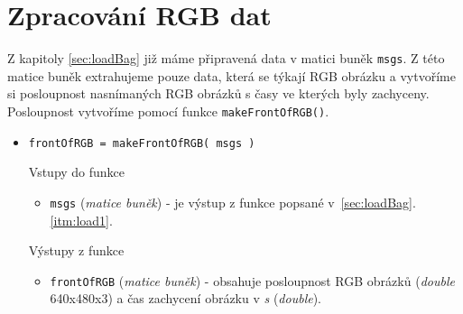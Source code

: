 \documentclass[10pt,a4paper,titlepage,oneside]{report}
\begin{document}
\section{Zpracování RGB dat}
\label{sec:procRgb}
Z kapitoly \ref{sec:loadBag} již máme připravená data v matici buněk \verb|msgs|. Z této matice buněk extrahujeme pouze data, která se týkají RGB obrázku a vytvoříme si posloupnost nasnímaných RGB obrázků s časy ve kterých byly zachyceny. Posloupnost vytvoříme pomocí funkce \verb|makeFrontOfRGB()|.
\begin{itemize}
  	\item \verb|frontOfRGB = makeFrontOfRGB( msgs )|

    		Vstupy do funkce
        		\begin{itemize}
  			\item \verb|msgs| (\textit{matice buněk}) - je výstup z funkce popsané v~\ref{sec:loadBag}.\ref{itm:load1}.
    			\end{itemize}
    		Výstupy z funkce
        		\begin{itemize}
  			\item \verb|frontOfRGB| (\textit{matice buněk}) - obsahuje posloupnost RGB obrázků (\textit{double} 640x480x3) a čas zachycení obrázku v \textit{s} (\textit{double}). 
    			\end{itemize}
    \end{itemize}
\end{document}
